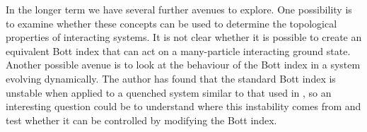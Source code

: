 In the longer term we have several further avenues to explore. One possibility is to examine whether these concepts can be used to determine the topological properties of interacting systems. It is not clear whether it is possible to create an equivalent Bott index that can act on a many-particle interacting ground state. Another possible avenue is to look at the behaviour of the Bott index in a system evolving dynamically. The author has found that the standard Bott index is unstable when applied to a quenched system similar to that used in \cite{caio_topological_2019}, so an interesting question could be to understand where this instability comes from and test whether it can be controlled by modifying the Bott index.